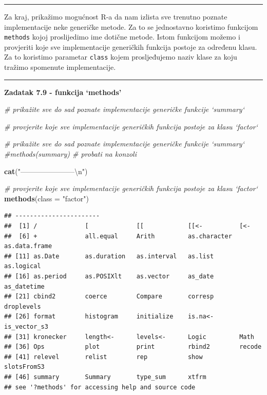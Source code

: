 \documentclass[]{book}
\newenvironment{Shaded}{\begin{snugshade}}{\end{snugshade}}
\newcommand{\KeywordTok}[1]{\textcolor[rgb]{0.13,0.29,0.53}{\textbf{#1}}}
\newcommand{\DataTypeTok}[1]{\textcolor[rgb]{0.13,0.29,0.53}{#1}}
\newcommand{\CharTok}[1]{\textcolor[rgb]{0.31,0.60,0.02}{#1}}
\newcommand{\StringTok}[1]{\textcolor[rgb]{0.31,0.60,0.02}{#1}}
\newcommand{\CommentTok}[1]{\textcolor[rgb]{0.56,0.35,0.01}{\textit{#1}}}
\newcommand{\NormalTok}[1]{#1}
\theoremstyle{definition}
\theoremstyle{definition}
\theoremstyle{definition}
\theoremstyle{remark}
\begin{document}
\begin{center}\rule{0.5\linewidth}{\linethickness}\end{center}

Za kraj, prikažimo mogućnost R-a da nam izlista sve trenutno poznate
implementacije neke generičke metode. Za to se jednostavno koristimo
funkcijom \texttt{methods} kojoj proslijedimo ime dotične metode. Istom
funkcijom možemo i provjeriti koje sve implementacije generičkih
funkcija postoje za određenu klasu. Za to koristimo parametar
\texttt{class} kojem prosljeđujemo naziv klase za koju tražimo spomenute
implementacije.

\begin{center}\rule{0.5\linewidth}{\linethickness}\end{center}

\textbf{Zadatak 7.9 - funkcija `methods'}

\begin{Shaded}
\begin{Highlighting}[]
\CommentTok{# prikažite sve do sad poznate implementacije generičke funkcije `summary`}

\CommentTok{# provjerite koje sve implementacije generičkih funkcija postoje za klasu `factor`}
\end{Highlighting}
\end{Shaded}

\begin{Shaded}
\begin{Highlighting}[]
\CommentTok{# prikažite sve do sad poznate implementacije generičke funkcije `summary`}
\CommentTok{#methods(summary)   # probati na konzoli}

\KeywordTok{cat}\NormalTok{(}\StringTok{"-----------------------}\CharTok{\textbackslash{}n}\StringTok{"}\NormalTok{)}

\CommentTok{# provjerite koje sve implementacije generičkih funkcija postoje za klasu `factor`}
\KeywordTok{methods}\NormalTok{(}\DataTypeTok{class =} \StringTok{"factor"}\NormalTok{)}
\end{Highlighting}
\end{Shaded}

\begin{verbatim}
## -----------------------
##  [1] /             [             [[            [[<-          [<-          
##  [6] +             all.equal     Arith         as.character  as.data.frame
## [11] as.Date       as.duration   as.interval   as.list       as.logical   
## [16] as.period     as.POSIXlt    as.vector     as_date       as_datetime  
## [21] cbind2        coerce        Compare       corresp       droplevels   
## [26] format        histogram     initialize    is.na<-       is_vector_s3 
## [31] kronecker     length<-      levels<-      Logic         Math         
## [36] Ops           plot          print         rbind2        recode       
## [41] relevel       relist        rep           show          slotsFromS3  
## [46] summary       Summary       type_sum      xtfrm        
## see '?methods' for accessing help and source code
\end{verbatim}
\end{document}
